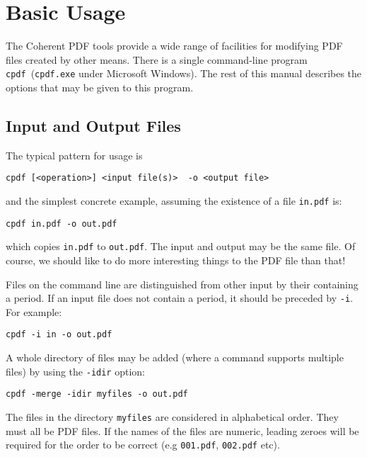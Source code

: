 \documentclass{book}
\newcommand{\cpdf}{\texttt{cpdf}}
\begin{document}
\chapter{Basic Usage}
\label{basicusage}
  The Coherent PDF tools provide a wide range of facilities for modifying PDF
files created by other means. There is a single command-line program
\cpdf\ (\texttt{cpdf.exe} under Microsoft Windows). The rest of this manual describes the options that may be given
to this program.
   
  \section{Input and Output Files}
  The typical pattern for usage is
  \begin{framed}
  \small\verb!cpdf [<operation>] <input file(s)>  -o <output file>!
  \end{framed}
  \noindent and the simplest concrete example, assuming the existence of a file
\texttt{in.pdf} is:
  \begin{framed}
  \small\verb!cpdf in.pdf -o out.pdf!
  \end{framed}
  \noindent which copies \texttt{in.pdf} to \texttt{out.pdf}. The input and
output may be the same file. Of course, we should like to do more interesting
things to the PDF file than that!

  Files on the command line are distinguished from other input by their
containing a period. If an input file does not contain a period, it should be
preceded by \verb!-i!. For example:

  \begin{framed}
  \small\verb!cpdf -i in -o out.pdf!
  \end{framed}
\noindent A whole directory of files may be added (where a command supports multiple files) by using the \verb!-idir! option:
  \begin{framed}
  \small\verb!cpdf -merge -idir myfiles -o out.pdf!
  \end{framed}
  \noindent The files in the directory \verb!myfiles! are considered in alphabetical order. They must all be PDF files. If the names of the files are numeric, leading zeroes will be required for the order to be correct (e.g \verb!001.pdf!, \verb!002.pdf! etc).
\end{document}
